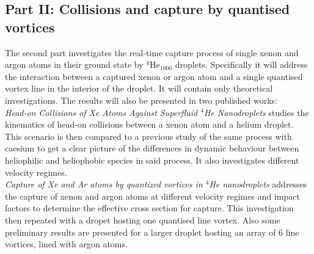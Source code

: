 		\subsection{Part II: Collisions and capture by quantised vortices}
			The second part investigates the real-time capture process of single xenon and argon atoms in their ground state by $^4$He$_{1000}$ droplets. Specifically it will address the interaction between a captured xenon or argon atom and a single quantised vortex line in the interior of the droplet. It will contain only theoretical investigations. The results will also be presented in two published works:\\
		
			\emph{Head-on Collisions of Xe Atoms Against Superfluid $^4\!$He Nanodroplets} studies the kinematics of head-on collisions between a xenon atom and a helium droplet. This scenario is then compared to a previous study of the same process with caesium to get a clear picture of the differences in dynamic behaviour between heliophilic and heliophobic species in said process. It also investigates different velocity regimes.\\
		
			\emph{Capture of Xe and Ar atoms by quantized vortices in $^4\!$He nanodroplets} addresses the capture of xenon and argon atoms at different velocity regimes and impact factors to determine the effective cross section for capture. This investigation then repeated with a dropet hosting one quantised line vortex. Also some preliminary results are presented for a larger droplet hosting an array of 6 line vortices, lined with argon atoms.